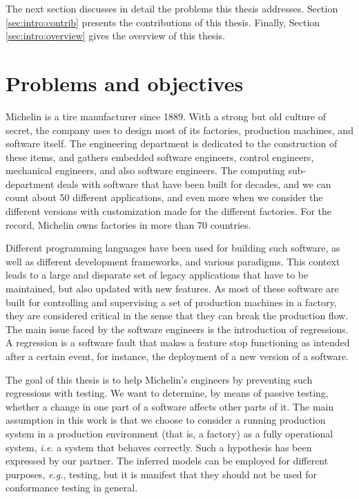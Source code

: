 The next section discusses in detail the problems this thesis
addresses. Section \ref{sec:intro:contrib} presents the
contributions of this thesis. Finally, Section
\ref{sec:intro:overview} gives the overview of this thesis.


\section{Problems and objectives}
\label{sec:intro:problems}

Michelin is a tire manufacturer since 1889. With a strong but old
culture of secret, the company uses to design most of its
factories, production machines, and software itself. The
engineering department is dedicated to the construction of these
items, and gathers embedded software engineers, control
engineers, mechanical engineers, and also software engineers. The
computing sub-department deals with software that have been built
for decades, and we can count about 50 different applications,
and even more when we consider the different versions with
customization made for the different factories. For the record,
Michelin owns factories in more than 70 countries.

Different programming languages have been used for building such
software, as well as different development frameworks, and
various paradigms. This context leads to a large and disparate
set of legacy applications that have to be maintained, but also
updated with new features. As most of these software are built
for controlling and supervising a set of production machines in a
factory, they are considered critical in the sense that they can
break the production flow. The main issue faced by the software
engineers is the introduction of regressions. A regression is a
software fault that makes a feature stop functioning as intended
after a certain event, for instance, the deployment of a new
version of a software.

The goal of this thesis is to help Michelin's
engineers by preventing such regressions with testing. We want to
determine, by means of passive testing, whether a change in one
part of a software affects other parts of it. The main assumption
in this work is that we choose to consider a running production
system in a production environment (that is, a factory) as a
fully operational system, \emph{i.e.} a system that behaves correctly.
Such a hypothesis has been expressed by our partner. The
inferred models can be employed for different purposes, \emph{e.g.},
testing, but it is manifest that they should not be used for
conformance testing in general.

